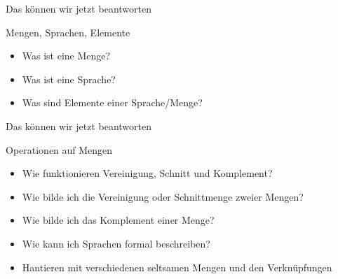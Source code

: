 \begin{frame}[fragile]{Das können wir jetzt beantworten}
	\begin{alertblock}{Mengen, Sprachen, Elemente}
		\begin{itemize}
			\item Was ist eine Menge?
			\item Was ist eine Sprache?
			\item Was sind Elemente einer Sprache/Menge?
		\end{itemize}
	\end{alertblock}
\end{frame}

\begin{frame}[fragile]{Das können wir jetzt beantworten}
	\begin{alertblock}{Operationen auf Mengen}
		\begin{itemize}
			\item Wie funktionieren Vereinigung, Schnitt und Komplement?
			\item Wie bilde ich die Vereinigung oder Schnittmenge zweier Mengen?
			\item Wie bilde ich das Komplement einer Menge?
			\item Wie kann ich Sprachen formal beschreiben?
			\item Hantieren mit verschiedenen seltsamen Mengen und den Verknüpfungen
		\end{itemize}
	\end{alertblock}
\end{frame}